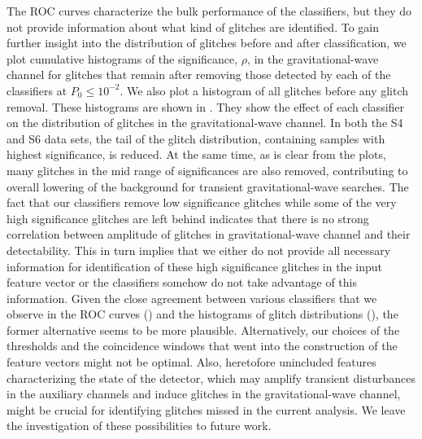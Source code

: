 \documentclass[prd, twocolumn, lengthcheck, superscriptaddress, showpacs, letterpaper, nofootinbib]{revtex4-1}
\begin{document}
The \ac{ROC} curves characterize the bulk performance of the classifiers, but they  do not provide information about what kind of glitches are identified. To gain further insight into the distribution of glitches before and after classification, we plot cumulative histograms of the significance, $\rho$, in the gravitational-wave channel for glitches that remain after removing those detected by each of the classifiers at $P_{0} \le 10^{-2}$. We also plot a histogram of all glitches before any glitch removal. These histograms are shown in  . They show the effect of each classifier on the distribution of glitches in the gravitational-wave channel. In both the S4 and S6 data sets, the tail of the glitch distribution, containing samples with highest significance, is reduced. At the same time, as is clear from the plots, many glitches in the mid range of significances are also removed, contributing to overall lowering of the background for transient gravitational-wave searches. The fact that our classifiers remove low significance glitches while some of the very high significance glitches are left behind indicates that there is no strong correlation between amplitude of glitches in gravitational-wave channel and their detectability. This in turn implies that we either do not provide all necessary information for identification of these high significance glitches in the input feature  vector or the classifiers somehow do not take advantage of this information. Given the close agreement between various classifiers that we observe in the \ac{ROC} curves () and the histograms of glitch distributions (), the former alternative seems to be more plausible. Alternatively, our choices of the thresholds and the coincidence windows that went into the construction of the feature vectors might not be optimal. Also, heretofore unincluded features characterizing the state of the detector, which may amplify transient disturbances in the auxiliary channels and induce glitches in the gravitational-wave channel, might be crucial for identifying glitches missed in the current analysis. We leave the investigation of these possibilities to future work.   

\end{document}
